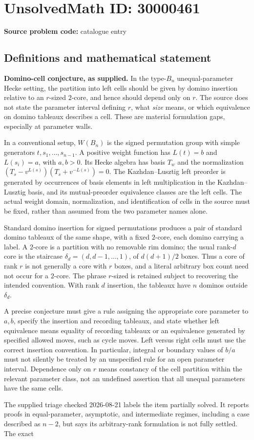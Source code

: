 \documentclass[11pt]{article}
\begin{document}
\section*{UnsolvedMath ID: 30000461}
\textbf{Source problem code:} catalogue entry
\subsection{Definitions and mathematical statement}
\textbf{Domino-cell conjecture, as supplied.} In the type-\(B_n\) unequal-parameter Hecke setting, the partition into left cells should be given by domino insertion relative to an \(r\)-sized \(2\)-core, and hence should depend only on \(r\). The source does not state the parameter interval defining \(r\), what \emph{size} means, or which equivalence on domino tableaux describes a cell. These are material formulation gaps, especially at parameter walls.\par In a conventional setup, \(W(B_n)\) is the signed permutation group with simple generators \(t,s_1,\ldots,s_{n-1}\). A positive weight function has \(L(t)=b\) and \(L(s_i)=a\), with \(a,b>0\). Its Hecke algebra has basis \(T_w\) and the normalization \((T_s-v^{L(s)})(T_s+v^{-L(s)})=0\). The Kazhdan--Lusztig left preorder is generated by occurrences of basis elements in left multiplication in the Kazhdan--Lusztig basis, and its mutual-preorder equivalence classes are the left cells. The actual weight domain, normalization, and identification of cells in the source must be fixed, rather than assumed from the two parameter names alone.\par Standard domino insertion for signed permutations produces a pair of standard domino tableaux of the same shape, with a fixed \(2\)-core, each domino carrying a label. A \(2\)-core is a partition with no removable rim domino; the usual rank-\(d\) core is the staircase \(\delta_d=(d,d-1,\ldots,1)\), of \(d(d+1)/2\) boxes. Thus a core of rank \(r\) is not generally a core with \(r\) boxes, and a literal arbitrary box count need not occur for a \(2\)-core. The phrase \(r\)-sized is retained subject to recovering the intended convention. With rank \(d\) insertion, the tableaux have \(n\) dominos outside \(\delta_d\).\par A precise conjecture must give a rule assigning the appropriate core parameter to \(a,b\), specify the insertion and recording tableaux, and state whether left equivalence means equality of recording tableaux or an equivalence generated by specified allowed moves, such as cycle moves. Left versus right cells must use the correct insertion convention. In particular, integral or boundary values of \(b/a\) must not silently be treated by an unspecified rule for an open parameter interval. Dependence only on \(r\) means constancy of the cell partition within the relevant parameter class, not an undefined assertion that all unequal parameters have the same cells.\par The supplied triage checked 2026-08-21 labels the item partially solved. It reports proofs in equal-parameter, asymptotic, and intermediate regimes, including a case described as \(n-2\), but says its arbitrary-rank formulation is not fully settled. The exact 
\end{document}
